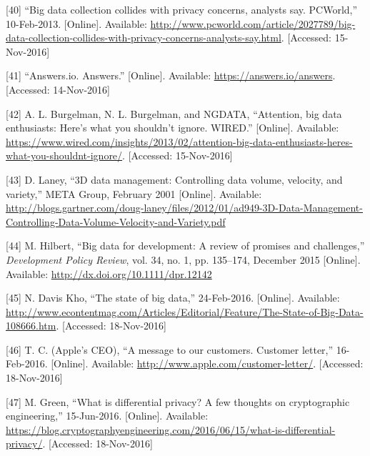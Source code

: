 \documentclass[12pt,english,a4paper,titlepage,cleardoublepage=empty,dottedtoc]{report}
\begin{document}
\hypertarget{ref-web_2013_big-data-collection-collides-with-privacy-concerns}{}
{[}40{]} ``Big data collection collides with privacy concerns, analysts
say. PCWorld,'' 10-Feb-2013. {[}Online{]}. Available:
\url{http://www.pcworld.com/article/2027789/big-data-collection-collides-with-privacy-concerns-analysts-say.html}.
{[}Accessed: 15-Nov-2016{]}

\hypertarget{ref-web_2016_answers-io}{}
{[}41{]} ``Answers.io. Answers.'' {[}Online{]}. Available:
\url{https://answers.io/answers}. {[}Accessed: 14-Nov-2016{]}

\hypertarget{ref-web_2016_big-data-enthusiasts-should-not-ignore}{}
{[}42{]} A. L. Burgelman, N. L. Burgelman, and NGDATA, ``Attention, big
data enthusiasts: Here's what you shouldn't ignore. WIRED.''
{[}Online{]}. Available:
\url{https://www.wired.com/insights/2013/02/attention-big-data-enthusiasts-heres-what-you-shouldnt-ignore/}.
{[}Accessed: 15-Nov-2016{]}

\hypertarget{ref-report_2001_3d-data-management-controlling-data-volume-velocity-and-variety}{}
{[}43{]} D. Laney, ``3D data management: Controlling data volume,
velocity, and variety,'' META Group, February 2001 {[}Online{]}.
Available:
\url{http://blogs.gartner.com/doug-laney/files/2012/01/ad949-3D-Data-Management-Controlling-Data-Volume-Velocity-and-Variety.pdf}

\hypertarget{ref-paper_2015_big-data-for-development-a-review-of-promises-and-challenges:more-data}{}
{[}44{]} M. Hilbert, ``Big data for development: A review of promises
and challenges,'' \emph{Development Policy Review}, vol. 34, no. 1, pp.
135--174, December 2015 {[}Online{]}. Available:
\url{http://dx.doi.org/10.1111/dpr.12142}

\hypertarget{ref-web_2016_the-state-of-big-data}{}
{[}45{]} N. Davis Kho, ``The state of big data,'' 24-Feb-2016.
{[}Online{]}. Available:
\url{http://www.econtentmag.com/Articles/Editorial/Feature/The-State-of-Big-Data-108666.htm}.
{[}Accessed: 18-Nov-2016{]}

\hypertarget{ref-web_2016_apple_customer-letter}{}
{[}46{]} T. C. (Apple's CEO), ``A message to our customers. Customer
letter,'' 16-Feb-2016. {[}Online{]}. Available:
\url{http://www.apple.com/customer-letter/}. {[}Accessed: 18-Nov-2016{]}

\hypertarget{ref-web_2016_what-is-differential-privacy}{}
{[}47{]} M. Green, ``What is differential privacy? A few thoughts on
cryptographic engineering,'' 15-Jun-2016. {[}Online{]}. Available:
\url{https://blog.cryptographyengineering.com/2016/06/15/what-is-differential-privacy/}.
{[}Accessed: 18-Nov-2016{]}
\end{document}
